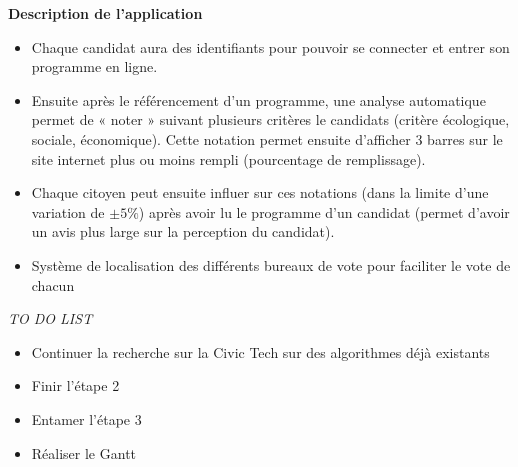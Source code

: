 \vskip 0.25cm

\noindent
\textbf{Description de l'application}
\begin{itemize}
    \item Chaque candidat aura des identifiants pour pouvoir se connecter et entrer son programme en ligne.
    \item Ensuite après le référencement d’un programme, une analyse automatique permet de « noter » suivant plusieurs critères le candidats (critère écologique, sociale, économique). Cette notation permet ensuite d’afficher 3 barres sur le site internet plus ou moins rempli (pourcentage de remplissage).
    \item Chaque citoyen peut ensuite influer sur ces notations (dans la limite d’une variation de $\pm 5\%$) après avoir lu le programme d’un candidat (permet d’avoir un avis plus large sur la perception du candidat).
    \item Système de localisation des différents bureaux de vote pour faciliter le vote de chacun
\end{itemize}

\vskip 1cm
\noindent
\textit{TO DO LIST}
\vskip 0.25cm

\begin{itemize}
    \item Continuer la recherche sur la Civic Tech sur des algorithmes déjà existants
    \item Finir l'étape 2
    \item Entamer l'étape 3
    \item Réaliser le Gantt
\end{itemize}